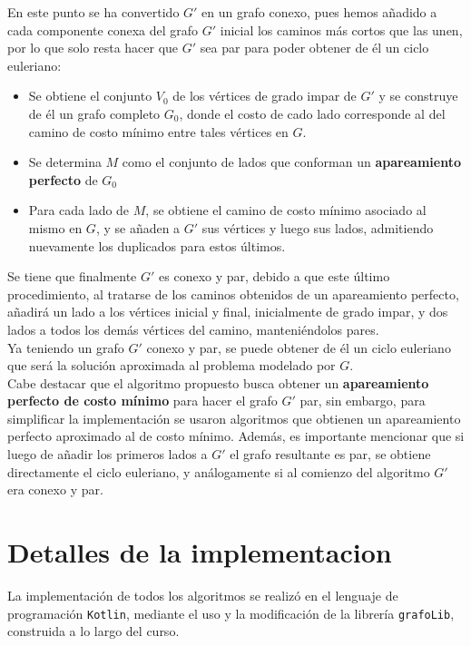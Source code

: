 \documentclass[11pt]{article}
\begin{document}
En este punto se ha convertido $G'$ en un grafo conexo, pues
hemos añadido a cada componente conexa del grafo $G'$ inicial
los caminos más cortos que las unen, por lo que solo resta
hacer que $G'$ sea par para poder obtener de él un ciclo
euleriano:

\begin{itemize}
   \item Se obtiene el conjunto $V_0$ de los vértices de 
   grado impar de $G'$ y se construye de él un grafo completo
   $G_0$, donde el costo de cado lado corresponde al del camino
   de costo mínimo entre tales vértices en $G$.

   \item Se determina $M$ como el conjunto de lados que conforman
   un \textbf{apareamiento perfecto} de $G_0$
   
   \item Para cada lado de $M$, se obtiene el camino de costo
   mínimo asociado al mismo en $G$, y se añaden a $G'$ sus
   vértices y luego sus lados, admitiendo nuevamente los
   duplicados para estos últimos.
\end{itemize}

Se tiene que finalmente $G'$ es conexo y par, debido a que este
último procedimiento, al tratarse de los caminos obtenidos de
un apareamiento perfecto, añadirá un lado a los vértices inicial y final,
inicialmente de grado impar, y dos lados a todos los demás vértices
del camino, manteniéndolos pares. \\

Ya teniendo un grafo $G'$ conexo y par, se puede obtener de él
un ciclo euleriano que será la solución aproximada al problema 
modelado por $G$. \\

Cabe destacar que el algoritmo propuesto busca obtener un
\textbf{apareamiento perfecto de costo mínimo} para hacer el
grafo $G'$ par, sin embargo, para simplificar la implementación
se usaron algoritmos que obtienen un apareamiento perfecto 
aproximado al de costo mínimo. Además, es importante mencionar
que si luego de añadir los primeros lados a $G'$ el grafo resultante
es par, se obtiene directamente el ciclo euleriano, y análogamente
si al comienzo del algoritmo $G'$ era conexo y par.

\section{Detalles de la implementacion}

La implementación de todos los algoritmos se realizó en el
lenguaje de programación \texttt{Kotlin}, mediante el uso
y la modificación de la librería \texttt{grafoLib}, construida
a lo largo del curso. \\
\end{document}
